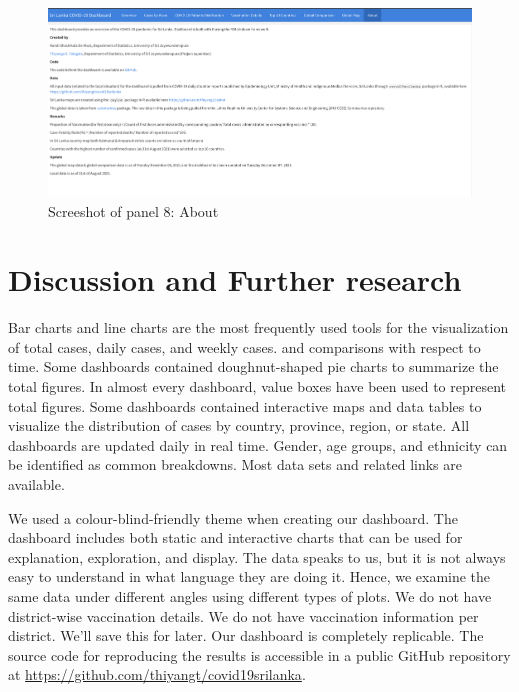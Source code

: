 \documentclass[
]{article}
\begin{document}
\begin{figure}

{\centering \includegraphics[width=0.8\linewidth]{Images/image8} 

}

\caption{Screeshot of panel 8: About}\label{fig:unnamed-chunk-12}
\end{figure}

\newpage

\hypertarget{conclusions}{%
\section{Discussion and Further research}\label{conclusions}}

Bar charts and line charts are the most frequently used tools for the
visualization of total cases, daily cases, and weekly cases. and
comparisons with respect to time. Some dashboards contained
doughnut-shaped pie charts to summarize the total figures. In almost
every dashboard, value boxes have been used to represent total figures.
Some dashboards contained interactive maps and data tables to visualize
the distribution of cases by country, province, region, or state. All
dashboards are updated daily in real time. Gender, age groups, and
ethnicity can be identified as common breakdowns. Most data sets and
related links are available.

We used a colour-blind-friendly theme when creating our dashboard. The
dashboard includes both static and interactive charts that can be used
for explanation, exploration, and display. The data speaks to us, but it
is not always easy to understand in what language they are doing it.
Hence, we examine the same data under different angles using different
types of plots. We do not have district-wise vaccination details. We do
not have vaccination information per district. We'll save this for
later. Our dashboard is completely replicable. The source code for
reproducing the results is accessible in a public GitHub repository at
\url{https://github.com/thiyangt/covid19srilanka}.
\end{document}
